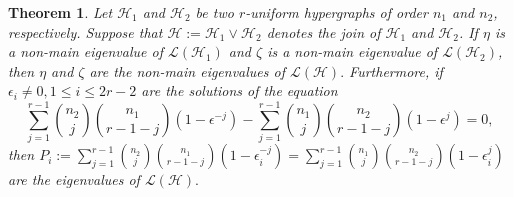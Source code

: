 \documentclass[10pt,a4paper]{article}
\newtheorem{theorem}{Theorem}[section]
\begin{document}
	
	\begin{theorem}
		Let $\mathcal{H}_1$ and $\mathcal{H}_2$ be two $r$-uniform hypergraphs of order $n_1$ and $n_2$, respectively. Suppose that $\mathcal{H}:=\mathcal{H}_1 \vee \mathcal{H}_2$ denotes the join of $\mathcal{H}_1$ and $\mathcal{H}_2$. 
		If $\eta$ is a non-main eigenvalue of $\mathcal{L}(\mathcal{H}_1)$ and $\zeta$ is a non-main eigenvalue of $\mathcal{L}(\mathcal{H}_2)$, then $\eta$ and $\zeta$ are the non-main eigenvalues of $\mathcal{L}(\mathcal{H}).$
		Furthermore, if $\epsilon_i \neq 0, 1 \leq i \leq 2r-2$ are the solutions of the equation
		\begin{equation}
			\sum\limits_{j=1}^{r-1} \binom{n_2}{j}\binom{n_1}{r-1-j} (1-\epsilon^{-j}) - \sum\limits_{j=1}^{r-1} \binom{n_1}{j}\binom{n_2}{r-1-j} (1-\epsilon^{j}) = 0, \label{eqn_join_laplacian}
		\end{equation} then $P_i:= \sum\limits_{j=1}^{r-1} \binom{n_2}{j}\binom{n_1}{r-1-j} (1-\epsilon_i^{-j})=\sum\limits_{j=1}^{r-1} \binom{n_1}{j}\binom{n_2}{r-1-j} (1-\epsilon_i^{j})$ are the eigenvalues of $\mathcal{L}(\mathcal{H}).$
	\end{theorem}
\end{document}
